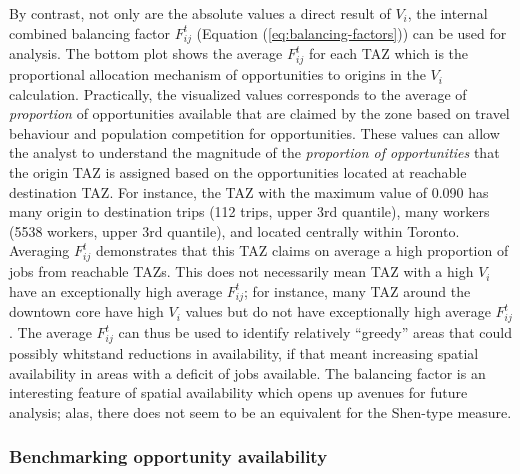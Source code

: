 \documentclass[10pt,letterpaper]{article}
\begin{document}
By contrast, not only are the absolute values a direct result of
\(V_i\), the internal combined balancing factor \(F_{ij}^t\) (Equation
(\ref{eq:balancing-factors})) can be used for analysis. The bottom plot
shows the average \(F_{ij}^t\) for each TAZ which is the proportional
allocation mechanism of opportunities to origins in the \(V_i\)
calculation. Practically, the visualized values corresponds to the
average of \emph{proportion} of opportunities available that are claimed
by the zone based on travel behaviour and population competition for
opportunities. These values can allow the analyst to understand the
magnitude of the \emph{proportion of opportunities} that the origin TAZ
is assigned based on the opportunities located at reachable destination
TAZ. For instance, the TAZ with the maximum value of 0.090 has many
origin to destination trips (112 trips, upper 3rd quantile), many
workers (5538 workers, upper 3rd quantile), and located centrally within
Toronto. Averaging \(F_{ij}^t\) demonstrates that this TAZ claims on
average a high proportion of jobs from reachable TAZs. This does not
necessarily mean TAZ with a high \(V_i\) have an exceptionally high
average \(F_{ij}^t\); for instance, many TAZ around the downtown core
have high \(V_i\) values but do not have exceptionally high average
\(F_{ij}^t\). The average \(F_{ij}^t\) can thus be used to identify
relatively ``greedy'' areas that could possibly whitstand reductions in
availability, if that meant increasing spatial availability in areas
with a deficit of jobs available. The balancing factor is an interesting
feature of spatial availability which opens up avenues for future
analysis; alas, there does not seem to be an equivalent for the
Shen-type measure.

\hypertarget{benchmarking-opportunity-availability}{%
\subsubsection{Benchmarking opportunity
availability}\label{benchmarking-opportunity-availability}}
\end{document}
